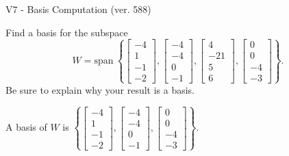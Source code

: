 \begin{exercise}
  \begin{exerciseTitle}V7 - Basis Computation (ver. 588)\end{exerciseTitle}
  \begin{exerciseStatement}
    Find a basis for the subspace 
\[W=\mathrm{span}\ \left\{\left[\begin{array}{r}
-4 \\
1 \\
-1 \\
-2
\end{array}\right] , \left[\begin{array}{r}
-4 \\
-4 \\
0 \\
-1
\end{array}\right] , \left[\begin{array}{r}
4 \\
-21 \\
5 \\
6
\end{array}\right] , \left[\begin{array}{r}
0 \\
0 \\
-4 \\
-3
\end{array}\right]\right\}.\]
 Be sure to explain why your result is a basis.


  \end{exerciseStatement}
  \begin{exerciseAnswer}
   A basis of \(W\) is  \(\left\{\left[\begin{array}{r}
-4 \\
1 \\
-1 \\
-2
\end{array}\right] , \left[\begin{array}{r}
-4 \\
-4 \\
0 \\
-1
\end{array}\right] , \left[\begin{array}{r}
0 \\
0 \\
-4 \\
-3
\end{array}\right]\right\}\).
  


  \end{exerciseAnswer}
\end{exercise}